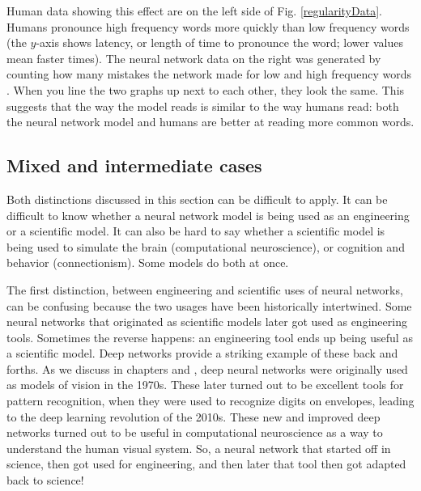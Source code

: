 Human data showing this effect are on the left side of Fig. \ref{regularityData}. Humans pronounce high frequency words more quickly than  low frequency words (the $y$-axis shows latency, or length of time to pronounce the word; lower values mean faster times). The neural network data on the right  was generated by counting how many mistakes the network made for low and high frequency words \cite{seidenberg1989distributed}. When you line the two graphs up next to each other, they look the same. This suggests that the way the model reads is similar to the way humans read: both the neural network model and humans are better at reading more common words.

\subsection{Mixed and intermediate cases}

Both distinctions discussed in this section can be difficult to apply. It can be difficult to know whether a neural network model is being used as an engineering or a scientific model. It can also be hard to say whether a scientific model is being used to simulate the brain (computational neuroscience), or cognition and behavior (connectionism). Some models do both at once.

The first distinction, between engineering and scientific uses of neural networks, can be confusing because the two usages have been historically intertwined. Some neural networks that originated as scientific models later got used as engineering tools. Sometimes the reverse happens: an engineering tool ends up being useful as a scientific model. Deep networks provide a striking example of these back and forths. As we discuss in chapters  and  , deep neural networks  were originally used as models of vision in the 1970s. These later turned out to be excellent tools for pattern recognition, when they were used to recognize digits on envelopes, leading to the deep learning revolution of the 2010s. These new and improved deep networks turned out to be useful in computational neuroscience as a way to understand the human visual system. So, a neural network that started off in science, then got used for engineering, and then later that tool then got adapted back to science!

